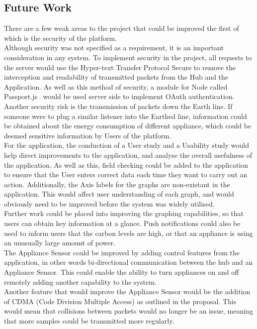 \documentclass[draft,preprint,12pt,3p]{elsarticle}
\begin{document}
\subsection{Future Work}
There are a few weak areas to the project that could be improved the first of which is the security of the platform.\\ 
Although security was not specified as a requirement, it is an important consideration in any system. To implement security in the project, all requests to the server would use the Hyper-text Transfer Protocol Secure to remove the interception and readability of transmitted packets from the Hub and the Application. As well as this method of security, a module for Node called Passport.js~\cite{passportjs} would be used server side to implement OAuth authentication.\\
Another security risk is the transmission of packets down the Earth line. If someone were to plug a similar listener into the Earthed line, information could be obtained about the energy consumption of different appliance, which could be deemed sensitive information by Users of the platform.\\
For the application, the conduction of a User study and a Usability study would help direct improvements to the application, and analyse the overall usefulness of the application. As well as this, field checking could be added to the application to ensure that the User enters correct data each time they want to carry out an action. Additionally, the Axis labels for the graphs are non-existant in the application. This would affect user understanding of each graph, and would obviously need to be improved before the system was widely utilised. \\
Further work could be placed into improving the graphing capabilities, so that users can obtain key information at a glance. Push notifications could also be used to inform users that the carbon levels are high, or that an appliance is using an unusually large amount of power.\\
The Appliance Sensor could be improved by adding control features from the application, in other words bi-directional communication between the hub and an Appliance Sensor. This could enable the ability to turn appliances on and off remotely adding another capability to the system.\\
Another feature that would improve the Appliance Sensor would be the addition of CDMA (Code Division Multiple Access) as outlined in the proposal. This would mean that collisions between packets would no longer be an issue, meaning that more samples could be transmitted more regularly.\\
\end{document}
